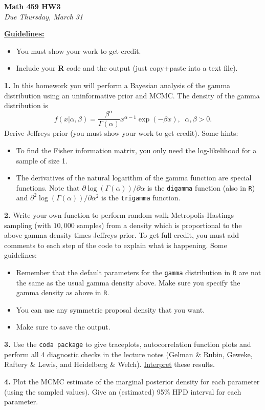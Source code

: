 \documentclass[12pt]{article}
\begin{document}
\vspace{-2cm}
\begin{center}
{\large \bf Math 459 HW3} \\
{\it Due Thursday, March 31} \\
\end{center}

\noindent
\textbf{\underline{Guidelines:}}
\begin{itemize}
\item You must show your work to get credit.
\item Include your \textbf{R} code and the output (just copy+paste into a text file).
\end{itemize}


\textbf{1.} In this homework you will perform a Bayesian analysis of the gamma distribution using an uninformative prior and MCMC. The density of the gamma distribution is
$$
f(x | \alpha, \beta)=\frac{\beta^{\alpha}}{\Gamma(\alpha)}x^{\alpha-1}\exp(-\beta x), \;\; \alpha, \beta > 0.
$$
Derive Jeffreys prior (you must show your work to get credit). Some hints:
\begin{itemize}
\item To find the Fisher information matrix, you only need the log-likelihood for a sample of size 1. 
\item The derivatives of the natural logarithm of the gamma function are special functions. Note that $\partial\log(\Gamma(\alpha))/\partial \alpha$ is the \texttt{digamma} function (also in \texttt{R}) and $\partial^{2}\log(\Gamma(\alpha))/\partial \alpha^{2}$ is the \texttt{trigamma} function.
\end{itemize}



\bigskip
\textbf{2.} Write your own function to perform random walk Metropolis-Hastings sampling (with $10,000$ samples) from a density which is proportional to the above gamma density times Jeffreys prior. To get full credit, you must add comments to each step of the code to explain what is happening. Some guidelines:
\begin{itemize}
\item Remember that the default parameters for the \texttt{gamma} distribution in \texttt{R} are not the same as the usual gamma density above. Make sure you specify the gamma density as above in \texttt{R}.
\item You can use any symmetric proposal density that you want.
\item Make sure to save the output.
\end{itemize}


\bigskip
\textbf{3.} Use the \texttt{coda package} to give traceplots, autocorrelation function plots and perform all 4 diagnostic checks in the lecture notes (Gelman \& Rubin, Geweke, Raftery \& Lewis, and Heidelberg \& Welch). \underline{Interpret} these results.


\bigskip
\textbf{4.} Plot the MCMC estimate of the marginal posterior density for each parameter (using the sampled values). Give an (estimated) 95\% HPD interval for each parameter.
\end{document}
